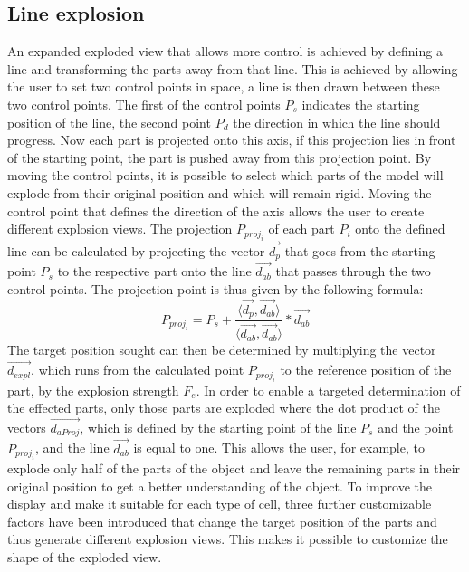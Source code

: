 \subsection{Line explosion}
An expanded exploded view that allows more control is achieved by defining a line and transforming the parts away from that line.
This is achieved by allowing the user to set two control points in space, a line is then drawn between these two control points. 
The first of the control points $P_s$ indicates the starting position of the line, the second point $P_d$ the direction in which the line should progress. 
Now each part is projected onto this axis, if this projection lies in front of the starting point, the part is pushed away from this projection point. 
By moving the control points, it is possible to select which parts of the model will explode from their original position and which will remain rigid. 
Moving the control point that defines the direction of the axis allows the user to create different explosion views.
The projection $P_{proj_i}$ of each part $P_i$ onto the defined line can be calculated by projecting the vector $\vec{d_p}$ that goes from the starting point $P_s$ to the respective part onto the line $\vec{d_{ab}}$ that passes through the two control points. 
The projection point is thus given by the following formula:
\begin{equation}
	P_{proj_i} = P_s + \frac{\langle\vec{d_p},\vec{d_{ab}}\rangle}{\langle\vec{d_{ab}},\vec{d_{ab}}\rangle} * \vec{d_{ab}}
	\label{eq:LineProj}
\end{equation}
The target position sought can then be determined by multiplying the vector $\vec{d_{expl}}$, which runs from the calculated point $P_{proj_i}$ to the reference position of the part, by the explosion strength $F_e$.
In order to enable a targeted determination of the effected parts, only those parts are exploded where the dot product of the vectors $\vec{d_{aProj}}$, which is defined by the starting point of the line $P_s$ and the point $P_{proj_i}$, and the line $\vec{d_{ab}}$ is equal to one.
This allows the user, for example, to explode only half of the parts of the object and leave the remaining parts in their original position to get a better understanding of the object. 
To improve the display and make it suitable for each type of cell, three further customizable factors have been introduced that change the target position of the parts and thus generate different explosion views. 
This makes it possible to customize the shape of the exploded view.
